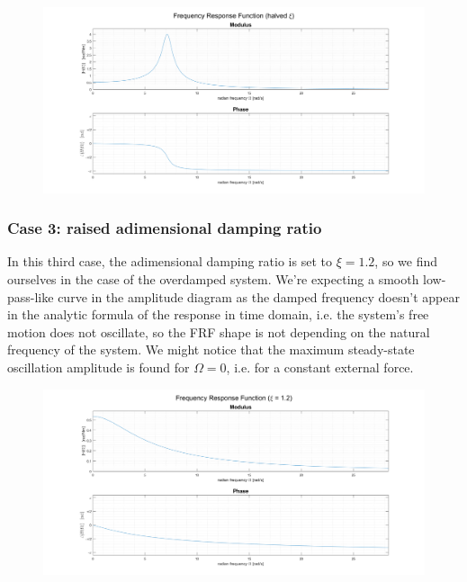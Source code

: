 \documentclass[a4paper,12pt,oneside]{article}
\begin{document}
\begin{figure}[H]
	\hspace{-70pt}
	\includegraphics[scale=0.4]{frf_halved_damping_ratio}
\end{figure}

\subsubsection*{Case 3: raised adimensional damping ratio}

In this third case, the adimensional damping ratio is set to $ \xi = 1.2 $, so we find ourselves in the case of the overdamped system. We're expecting a smooth low-pass-like curve in the amplitude diagram as the damped frequency doesn't appear in the analytic formula of the response in time domain, i.e. the system's free motion does not oscillate, so the FRF shape is not depending on the natural frequency of the system. We might notice that the maximum steady-state oscillation amplitude is found for $ \Omega = 0 $, i.e. for a constant external force.

\begin{figure}[H]
	\hspace{-70pt}
	\includegraphics[scale=0.4]{frf_overdamped}
\end{figure}
\end{document}
